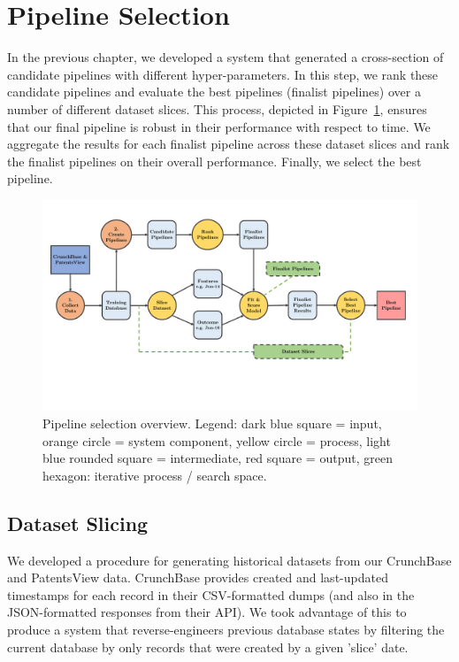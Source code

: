 \documentclass[../thesis/thesis.tex]{subfiles}
\begin{document}
\section{Pipeline Selection}

In the previous chapter, we developed a system that generated a cross-section of candidate pipelines with different hyper-parameters. In this step, we rank these candidate pipelines and evaluate the best pipelines (finalist pipelines) over a number of different dataset slices. This process, depicted in Figure~\ref{fig:design:pipeline_selection}, ensures that our final pipeline is robust in their performance with respect to time. We aggregate the results for each finalist pipeline across these dataset slices and rank the finalist pipelines on their overall performance. Finally, we select the best pipeline.

\begin{figure}[!htb]
    \centering
    \includegraphics[width=\textwidth]{../figures/design/flowchart_pipeline_selection}
    \caption[Pipeline selection flowchart]{Pipeline selection overview. Legend: dark blue square = input, orange circle = system component, yellow circle = process, light blue rounded square = intermediate, red square = output, green hexagon: iterative process / search space.}
    \label{fig:design:pipeline_selection}
\end{figure}

\subsection{Dataset Slicing}

We developed a procedure for generating historical datasets from our CrunchBase and PatentsView data. CrunchBase provides created and last-updated timestamps for each record in their CSV-formatted dumps (and also in the JSON-formatted responses from their API). We took advantage of this to produce a system that reverse-engineers previous database states by filtering the current database by only records that were created by a given 'slice' date.
\end{document}
